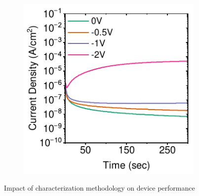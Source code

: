 \begin{figure}[ht!]
    \begin{subfigure}[b]{0.35\textwidth}
        \centering
        \includegraphics[width=\textwidth]{chapters/material_properties/images/Steady-State-plot.pdf}
        \caption{}
        \label{fig:ch2:steady_state}
    \end{subfigure}

    \caption{Impact of characterization methodology on device performance}
    \label{fig:ch2:types_of_measurement}
\end{figure}


